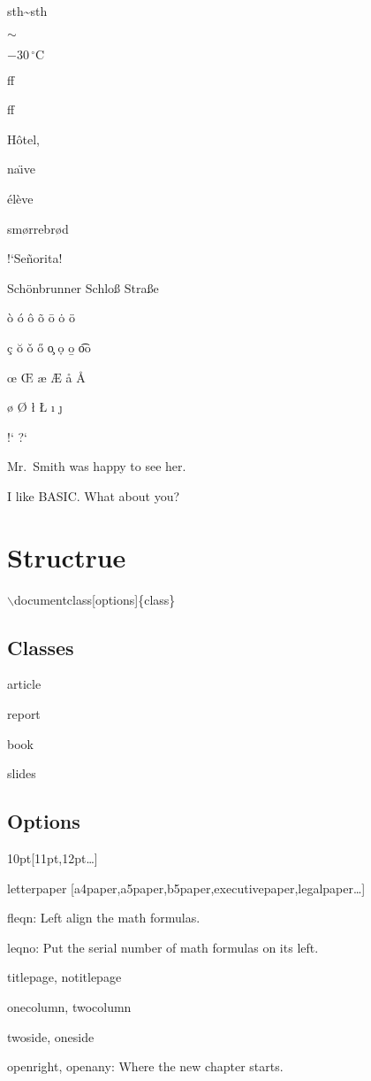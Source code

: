 sth\~{}sth

$\sim$

$-30\,^{\circ}\mathrm{C}$

ff

f\mbox{}f

H\^otel,

na\"\i ve

\'el\`eve

sm\o rrebr\o d

!`Se\~norita!

Sch\"onbrunner Schlo\ss{} Stra\ss e

\`o{} \'o{} \^o{} \~o{} \=o{} \.o{} \"o{}

\c c \u o \v o \H o \c o \d o \b o \t oo

\oe{} \OE{} \ae{} \AE{} \aa{} \AA{}

\o{} \O{} \l{} \L{} \i{} \j{}

!`{} ?`

Mr.~Smith was happy to see her.

I like BASIC\@. What about you?

\section{Structrue}

$\backslash$documentclass[options]\{class\}

\subsection{Classes}

article

report

book

slides

\subsection{Options}

10pt[11pt,12pt\ldots]

letterpaper [a4paper,a5paper,b5paper,executivepaper,legalpaper\ldots]

fleqn: Left align the math formulas.

leqno: Put the serial number of math formulas on its left.

titlepage, notitlepage

onecolumn, twocolumn

twoside, oneside

openright, openany: Where the new chapter starts.

